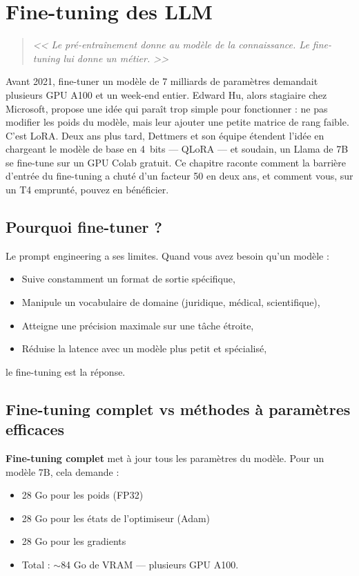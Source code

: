 \chapter{Fine-tuning des LLM}
\label{ch:finetuning}

\begin{quote}
\emph{<< Le pr\'e-entra\^inement donne au mod\`ele de la connaissance. Le fine-tuning lui donne un m\'etier. >>}
\end{quote}

Avant 2021, fine-tuner un modèle de 7 milliards de paramètres demandait plusieurs GPU A100 et un week-end entier. Edward Hu, alors stagiaire chez Microsoft, propose une idée qui paraît trop simple pour fonctionner : ne pas modifier les poids du modèle, mais leur ajouter une petite matrice de rang faible. C'est LoRA. Deux ans plus tard, Dettmers et son équipe étendent l'idée en chargeant le modèle de base en 4~bits --- QLoRA --- et soudain, un Llama de 7B se fine-tune sur un GPU Colab gratuit. Ce chapitre raconte comment la barrière d'entrée du fine-tuning a chuté d'un facteur 50 en deux ans, et comment vous, sur un T4 emprunté, pouvez en bénéficier.
\section{Pourquoi fine-tuner ?}

Le prompt engineering a ses limites. Quand vous avez besoin qu'un mod\`ele :
\begin{itemize}
  \item Suive constamment un format de sortie sp\'ecifique,
  \item Manipule un vocabulaire de domaine (juridique, m\'edical, scientifique),
  \item Atteigne une pr\'ecision maximale sur une t\^ache \'etroite,
  \item R\'eduise la latence avec un mod\`ele plus petit et sp\'ecialis\'e,
\end{itemize}
le fine-tuning est la r\'eponse.

\section{Fine-tuning complet vs m\'ethodes \`a param\`etres efficaces}

\textbf{Fine-tuning complet} met \`a jour tous les param\`etres du mod\`ele. Pour un mod\`ele 7B, cela demande :
\begin{itemize}
  \item 28 Go pour les poids (FP32)
  \item 28 Go pour les \'etats de l'optimiseur (Adam)
  \item 28 Go pour les gradients
  \item Total : $\sim$84 Go de VRAM --- plusieurs GPU A100.
\end{itemize}

